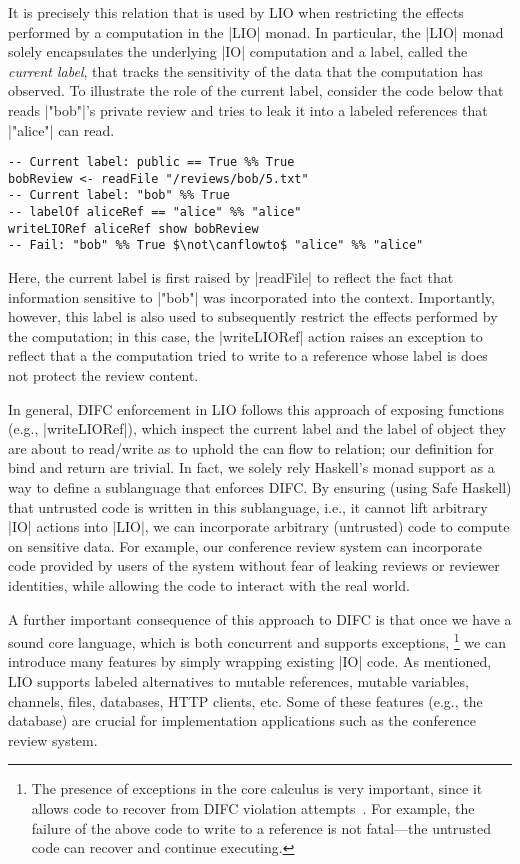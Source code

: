 It is precisely this relation that is used by LIO when restricting the
effects performed by a computation in the \hs|LIO| monad.
%
In particular, the \hs|LIO| monad solely encapsulates the underlying
\hs|IO| computation and a label, called the \emph{current label}, that
tracks the sensitivity of the data that the computation has observed.
%
To illustrate the role of the current label, consider the code below
that reads \hs|"bob"|'s private review and tries to leak it into a
labeled references that
\hs|"alice"| can read.
\begin{verbatim}
-- Current label: public == True %% True
bobReview <- readFile "/reviews/bob/5.txt"
-- Current label: "bob" %% True
-- labelOf aliceRef == "alice" %% "alice"
writeLIORef aliceRef show bobReview
-- Fail: "bob" %% True $\not\canflowto$ "alice" %% "alice"
\end{verbatim}
%
Here, the current label is first raised by \hs|readFile| to reflect
the fact that information sensitive to \hs|"bob"| was incorporated
into the context.
%
Importantly, however, this label is also used to subsequently restrict
the effects performed by the computation; in this case, the
\hs|writeLIORef| action raises an exception to reflect that a
the computation tried to write to a reference whose label is
does not protect the review content.

In general, DIFC enforcement in LIO follows this approach of exposing
functions (e.g., \hs|writeLIORef|), which inspect the current label
and the label of object they are about to read/write as to uphold the
can flow to relation; our definition for bind and return are trivial.
%
In fact, we solely rely Haskell's monad support as a way to define a
sublanguage that enforces DIFC.
%
By ensuring (using Safe Haskell) that untrusted code is written in
this sublanguage, i.e., it cannot lift arbitrary \hs|IO| actions into
\hs|LIO|, we can incorporate arbitrary (untrusted) code to compute on
sensitive data.
%
For example, our conference review system can incorporate code
provided by users of the system without fear of leaking reviews or
reviewer identities, while allowing the code to interact with the real
world.

A further important consequence of this approach to DIFC is that once
we have a sound core language, which is both concurrent and supports
exceptions, \footnote{
  The presence of exceptions in the core calculus is very important,
  since it allows code to recover from DIFC violation
  attempts~\cite{Breeze, stefan:2012:arxiv-flexible}.
  For example, the failure of the above code to write to a reference
  is not fatal---the untrusted code can recover and continue
  executing.
  
}
we can introduce many features by simply wrapping existing \hs|IO|
code.
%
As mentioned, LIO supports labeled alternatives to mutable references,
mutable variables, channels, files, databases, HTTP clients, etc.
%
Some of these features (e.g., the database) are crucial for
implementation applications such as the conference review system.

